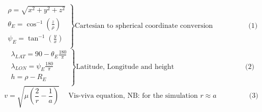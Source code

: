 \documentclass[11pt]{report}
\begin{document}
	\vspace{30pt}\noindent$$
	\left.
	\begin{array}{lll}
		\rho = \sqrt{x^2+y^2+z^2}\\
		\theta_E = \cos^{-1}\left(\frac{z}{\rho}\right)\\
		\psi_E = \tan^{-1}\left(\frac{y}{x}\right)\\
	\end{array}
	 \right \} \text{Cartesian to spherical coordinate conversion} \hspace{60pt}\text{(1)}
	$$	
	\vspace{25pt}\noindent$$
	\left.
	\begin{array}{lll}
		\lambda_{LAT} = 90-\theta_E\frac{180}{\pi}\\
		\lambda_{LON} = \psi_E\frac{180}{\pi}\\
		h = \rho-R_E\\
	\end{array}
	\right \} \text{Latitude, Longitude and height} \hspace{120pt}\text{(2)}
	$$
	\vspace{20pt}\noindent$$
	v = \sqrt{\mu\left(\frac{2}{r}-\frac{1}{a}\right)}\hspace{15pt}\text{Vis-viva equation, NB: for the simulation }r\approx a \hspace{55pt}\text{(3)}
	$$
	
\end{document}
